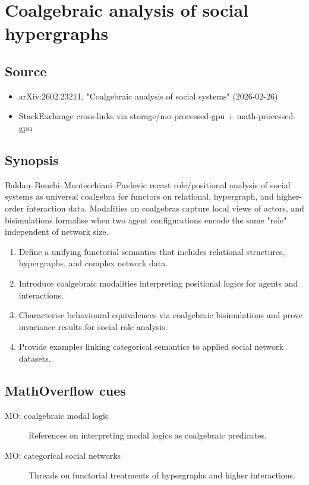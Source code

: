 \section*{Coalgebraic analysis of social hypergraphs}
\subsection*{Source}
\begin{itemize}
  \item arXiv:2602.23211, "Coalgebraic analysis of social systems" (2026-02-26)
  \item StackExchange cross-links via storage/mo-processed-gpu + math-processed-gpu
\end{itemize}
\subsection*{Synopsis}
Baldan--Bonchi--Montecchiani--Pavlovic recast role/positional analysis of social systems as universal coalgebra for functors on relational, hypergraph, and higher-order interaction data. Modalities on coalgebras capture local views of actors, and bisimulations formalise when two agent configurations encode the same "role" independent of network size.
\begin{enumerate}
  \item Define a unifying functorial semantics that includes relational structures, hypergraphs, and complex network data.
  \item Introduce coalgebraic modalities interpreting positional logics for agents and interactions.
  \item Characterise behavioural equivalences via coalgebraic bisimulations and prove invariance results for social role analysis.
  \item Provide examples linking categorical semantics to applied social network datasets.
\end{enumerate}
\subsection*{MathOverflow cues}
\begin{description}
  \item[MO: coalgebraic modal logic] References on interpreting modal logics as coalgebraic predicates.
  \item[MO: categorical social networks] Threads on functorial treatments of hypergraphs and higher interactions.
\end{description}
